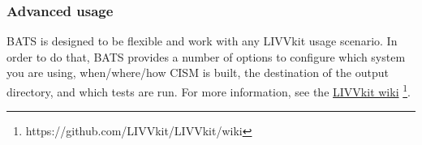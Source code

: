 \subsubsection{Advanced usage}
    
BATS is designed to be flexible and work with any LIVVkit usage scenario. In order to do that, BATS provides a number of
options to configure which system you are using, when/where/how CISM is built, the destination of the output directory,
and which tests are run. For more information, see the \href{https://github.com/LIVVkit/LIVVkit/wiki}{LIVVkit wiki}
\footnote{https://github.com/LIVVkit/LIVVkit/wiki}. 



